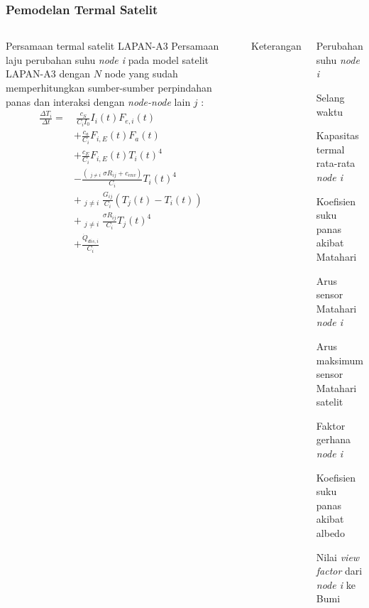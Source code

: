 \documentclass[8pt]{beamer}
\begin{document}
\begin{frame}
  \frametitle{Pemodelan Termal Satelit}
  \begin{columns}[T]
    \begin{block}{\normalsize Persamaan termal satelit LAPAN-A3}
      \small
  Persamaan laju perubahan suhu \textit{node i} pada model satelit LAPAN-A3 dengan $N$ node yang sudah memperhitungkan sumber-sumber perpindahan panas dan interaksi dengan \textit{node-node} lain $j$ \cite{martinez2022}:
\begin{equation}
\label{eq:lineq}
\begin{split}
	\frac{\Delta T_i}{\Delta t} = &\ \frac{c_S}{C_i I_0} I_{i}(t) F_{e,i}(t) \\
	&+ \frac{c_a}{C_i} F_{i,E}(t) F_a(t) \\
	&+ \frac{c_E}{C_i} F_{i,E}(t) T_{i}(t)^4 \\
	&- \frac{\left( \mathop{\sum_{j=1}^{N}}_{j \neq i} \sigma R_{ij} + c_{env} \right) }{C_i} T_{i}(t)^4 \\
	&+ \mathop{\sum_{j=1}^{N}}_{j \neq i} \frac{G_{ij}}{C_i} \left(T_j(t) - T_i(t)\right) \\
	&+ \mathop{\sum_{j=1}^{N}}_{j \neq i} \frac{\sigma R_{ij}}{C_i}T_{j}(t)^4 \\
	&+ \frac{\dot{Q}_{dis,i}}{C_i}
\end{split}
\end{equation}
    \end{block}
      \begin{center}Keterangan\end{center}
      \begin{description}
          \tiny
        \item[$\Delta T_{i}$] Perubahan suhu \textit{node i}
        \item[$\Delta t_{i}$] Selang waktu
        \item[$C_{i}$] Kapasitas termal rata-rata \textit{node i}
        \item[$c_S$] Koefisien suku panas akibat Matahari
        \item[$I_{i}$] Arus sensor Matahari \textit{node i}
        \item[$I_{0}$] Arus maksimum sensor Matahari satelit
        \item[$F_{e,i}$] Faktor gerhana \textit{node i}
        \item[$c_{a}$] Koefisien suku panas akibat albedo
        \item[$F_{i,E}$] Nilai \textit{view factor} dari \textit{node i} ke Bumi

\end{description}
\end{columns}
\end{frame}
\end{document}
